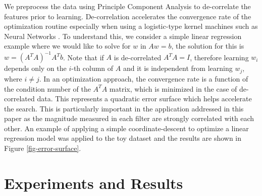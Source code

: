 \documentclass[useAMS,usenatbib,fleqn]{mn2e}
\begin{document}
We preprocess the data using Principle Component Analysis \citep[PCA;][]{jolliffe1986} to de-correlate the features prior to learning. De-correlation accelerates the convergence rate of the optimization routine especially when using a logistic-type kernel machines such as Neural Networks \citep{lecun1998}. To understand this, we consider a simple linear regression example where we would like to solve for $w$ in $Aw=b$, the solution for this is $w=\left(A^{T}A\right)^{-1}A^{T}b$. Note that if $A$ is de-correlated $A^{T}A=I$, therefore learning $w_{i}$ depends only on the $i$-th column of $A$ and it is independent from learning $w_{j}$, where $i\ne j$. In an optimization approach, the convergence rate is a function of the condition number of the $A^{T}A$ matrix, which is minimized in the case of de-correlated data. This represents a quadratic error surface which helps accelerate the search. This is particularly important in the application addressed in this paper as the magnitude measured in each filter are strongly correlated with each other. An example of applying a simple coordinate-descent to optimize a linear regression model was applied to the toy dataset and the results are shown in Figure \ref{fig-error-surface}.

\section{Experiments and Results}
\label{sec-experiments}
\end{document}
